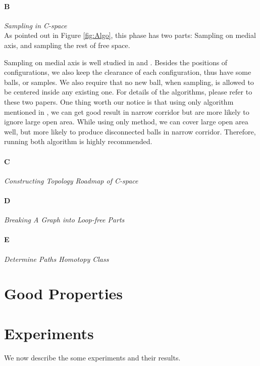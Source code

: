 \documentclass[11pt]{article}
\begin{document}
\paragraph{B} \emph{Sampling in C-space} \hfill \\
\indent As pointed out in Figure \ref{fig:Algo}, this phase has two parts: Sampling on medial axis, and sampling the rest of free space. 

\indent Sampling on medial axis is well studied in \cite{MAPRM} and \cite{UMAPRM}. Besides the positions of configurations, we also keep the clearance of each configuration, thus have some balls, or samples. We also require that no new ball, when sampling, is allowed to be centered inside any existing one. For details of the algorithms, please refer to these two papers. One thing worth our notice is that using only algorithm mentioned in \cite{MAPRM}, we can get good result in narrow corridor but are more likely to ignore large open area. While using only \cite{UMAPRM} method, we can cover large open area well, but more likely to produce disconnected balls in narrow corridor. Therefore, running both algorithm is highly recommended. 


\paragraph{C} \emph{Constructing Topology Roadmap of C-space} \hfill \\

\paragraph{D} \emph{Breaking A Graph into Loop-free Parts} \hfill\\

\paragraph{E} \emph{Determine Paths Homotopy Class} \hfill \\


\section{Good Properties}\label{properties}

\section{Experiments}\label{experiments}
We now describe the some experiments and their results.
\end{document}
